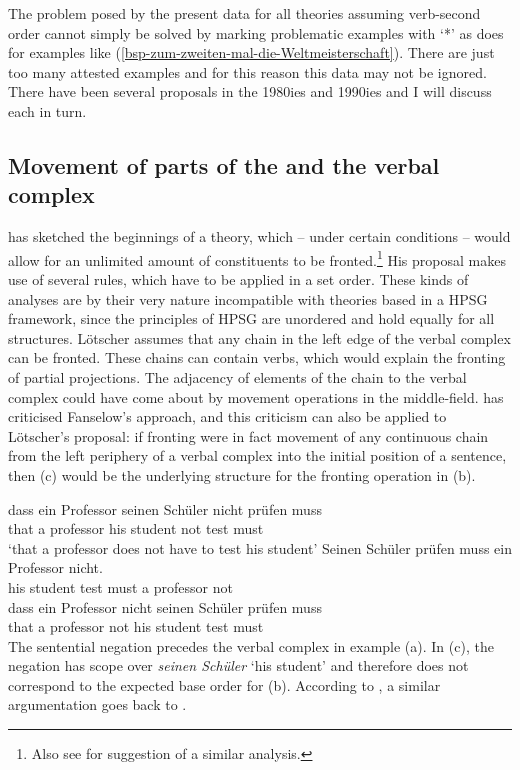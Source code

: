 The problem posed by the present data for all theories assuming verb-second order cannot simply be solved
by marking problematic examples with `*' as \citet[]{Bungarten73a} does for examples like
(\ref{bsp-zum-zweiten-mal-die-Weltmeisterschaft}). There are just too many attested examples and for
this reason this data may not be ignored. There have been several proposals in the 1980ies and
1990ies and I will discuss each in turn.

\subsection{Movement of parts of the \mf and the verbal complex}

\citet*{Loetscher85a} has sketched the beginnings of a theory, which -- under certain conditions -- would allow
for an unlimited amount of constituents to be fronted.\footnote{
  Also see  for suggestion of a similar analysis.%
}
His proposal makes use of several rules, which have to be applied in a set order. These kinds of analyses are by their very nature
incompatible with theories based in a HPSG framework, since the principles of HPSG are unordered and hold equally for all structures.
Lötscher assumes that any chain in the left edge of the verbal complex can be fronted. These chains can contain verbs, which
would explain the fronting of partial projections. The adjacency of elements of the chain to the verbal complex could have come
about by movement operations in the middle-field. \citet[]{Duerscheid89a} has criticised Fanselow's \citeyearpar{Fanselow87a} approach,
and this criticism can also be applied to Lötscher's proposal: if fronting were in fact movement of any continuous chain from the left
periphery of a verbal complex into the initial position of a sentence, then (c) would be the underlying structure for the
fronting operation in (b).



\eal
\ex 
\gll dass ein Professor seinen Schüler nicht prüfen muss\\
     that a professor his student not test must\\
\glt `that a professor does not have to test his student'
\ex
\gll Seinen Schüler prüfen muss ein Professor nicht.\\
     his student test must a professor not\\
\ex 
\gll dass ein Professor nicht seinen Schüler prüfen muss\\
     that a   professor not   his student test must\\
\zl
The sentential negation precedes the verbal complex in example (a). In (c), the negation
has scope over \emph{seinen Schüler} `his student' and therefore does not correspond to the expected
base order for (b). According to \citet[]{Duerscheid89a}, a similar argumentation goes back to \citep{Thiersch86a}.

